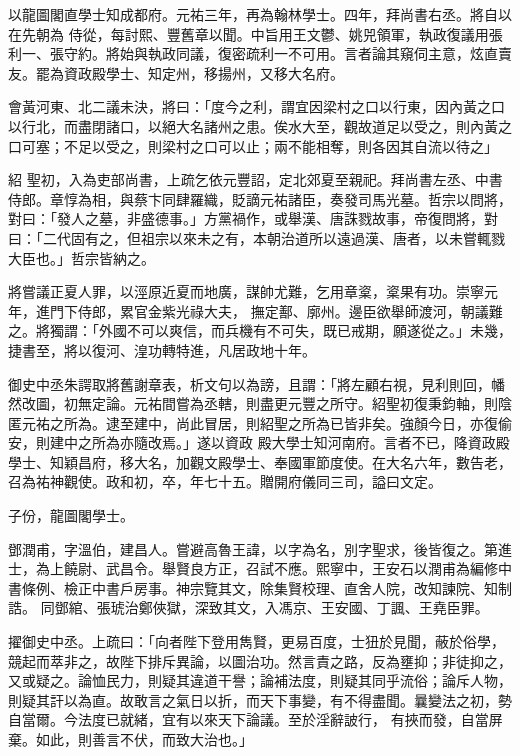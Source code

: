 \begin{pinyinscope}
 以龍圖閣直學士知成都府。元祐三年，再為翰林學士。四年，拜尚書右丞。將自以在先朝為
 侍從，每討熙、豐舊章以聞。中旨用王文鬱、姚兕領軍，執政復議用張利一、張守約。將始與執政同議，復密疏利一不可用。言者論其窺伺主意，炫直賣友。罷為資政殿學士、知定州，移揚州，又移大名府。



 會黃河東、北二議未決，將曰：「度今之利，謂宜因梁村之口以行東，因內黃之口以行北，而盡閉諸口，以絕大名諸州之患。俟水大至，觀故道足以受之，則內黃之口可塞；不足以受之，則梁村之口可以止；兩不能相奪，則各因其自流以待之」



 紹
 聖初，入為吏部尚書，上疏乞依元豐詔，定北郊夏至親祀。拜尚書左丞、中書侍郎。章惇為相，與蔡卞同肆羅織，貶謫元祐諸臣，奏發司馬光墓。哲宗以問將，對曰：「發人之墓，非盛德事。」方黨禍作，或舉漢、唐誅戮故事，帝復問將，對曰：「二代固有之，但祖宗以來未之有，本朝治道所以遠過漢、唐者，以未嘗輒戮大臣也。」哲宗皆納之。



 將嘗議正夏人罪，以涇原近夏而地廣，謀帥尤難，乞用章楶，楶果有功。崇寧元年，進門下侍郎，累官金紫光祿大夫，
 撫定鄯、廓州。邊臣欲舉師渡河，朝議難之。將獨謂：「外國不可以爽信，而兵機有不可失，既已戒期，願遂從之。」未幾，捷書至，將以復河、湟功轉特進，凡居政地十年。



 御史中丞朱諤取將舊謝章表，析文句以為謗，且謂：「將左顧右視，見利則回，幡然改圖，初無定論。元祐間嘗為丞轄，則盡更元豐之所守。紹聖初復秉鈞軸，則陰匿元祐之所為。逮至建中，尚此冒居，則紹聖之所為已皆非矣。強顏今日，亦復偷安，則建中之所為亦隨改焉。」遂以資政
 殿大學士知河南府。言者不已，降資政殿學士、知穎昌府，移大名，加觀文殿學士、奉國軍節度使。在大名六年，數告老，召為祐神觀使。政和初，卒，年七十五。贈開府儀同三司，謚曰文定。



 子份，龍圖閣學士。



 鄧潤甫，字溫伯，建昌人。嘗避高魯王諱，以字為名，別字聖求，後皆復之。第進士，為上饒尉、武昌令。舉賢良方正，召試不應。熙寧中，王安石以潤甫為編修中書條例、檢正中書戶房事。神宗覽其文，除集賢校理、直舍人院，改知諫院、知制誥。
 同鄧綰、張琥治鄭俠獄，深致其文，入馮京、王安國、丁諷、王堯臣罪。



 擢御史中丞。上疏曰：「向者陛下登用雋賢，更易百度，士狃於見聞，蔽於俗學，競起而萃非之，故陛下排斥異論，以圖治功。然言責之路，反為壅抑；非徒抑之，又或疑之。論恤民力，則疑其違道干譽；論補法度，則疑其同乎流俗；論斥人物，則疑其訐以為直。故敢言之氣日以折，而天下事變，有不得盡聞。曩變法之初，勢自當爾。今法度已就緒，宜有以來天下論議。至於淫辭詖行，
 有挾而發，自當屏棄。如此，則善言不伏，而致大治也。」




\end{pinyinscope}
